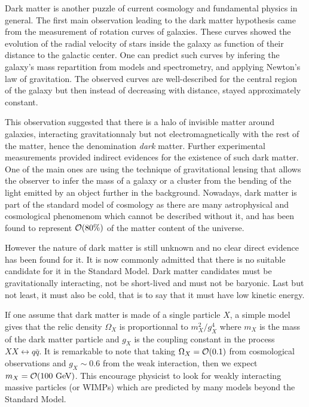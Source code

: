     Dark matter is another puzzle of current cosmology and fundamental physics in general.
    The first main observation leading to the dark matter hypothesis came from the measurement
    of rotation curves of galaxies. These curves showed the evolution of the radial velocity
    of stars inside the galaxy as function of their distance to the galactic center. One
    can predict such curves by infering the galaxy's mass repartition from models and
    spectrometry, and applying Newton's law of gravitation. The observed curves are
    well-described for the central region of the galaxy but then instead of decreasing
    with distance, stayed approximately constant.

    This observation suggested that there is a halo of invisible matter around
    galaxies, interacting gravitationnaly but not electromagnetically with the rest of the
    matter, hence the denomination \emph{dark} matter. Further experimental measurements
    provided indirect evidences for the existence of such dark matter. One of the main
    ones are using the technique of gravitational lensing that allows the observer to
    infer the mass of a galaxy or a cluster from the bending of the light emitted by
    an object further in the background. Nowadays, dark matter is part of the standard
    model of cosmology as there are many astrophysical and cosmological phenomenom which
    cannot be described without it, and has been found to represent $\mathcal{O}(80\%)$ of
    the matter content of the universe.

    However the nature of dark matter is still unknown and no clear direct evidence has
    been found for it. It is now commonly admitted that there is no suitable candidate
    for it in the Standard Model. Dark matter candidates must be gravitationally interacting,
    not be short-lived and must not be baryonic. Last but not least, it must also be
    cold, that is to say that it must have low kinetic energy.

    If one assume that dark matter is made of a single particle $X$, a simple model gives that
    the relic density $\Omega_X$ is proportionnal to $m_X^2 / g^4_X$ where $m_X$ is the
    mass of the dark matter particle and $g_X$ is the coupling constant in the process
    $XX \leftrightarrow q\bar{q}$. It is remarkable to note that taking $\Omega_X = \mathcal{O}(0.1)$
    from cosmological observations and $g_X \sim 0.6$ from the weak interaction, then
    we expect $m_X = \mathcal{O}(100~\text{GeV})$. This encourage physicist to look for weakly
    interacting massive particles (or WIMPs) which are predicted by many models beyond
    the Standard Model.

